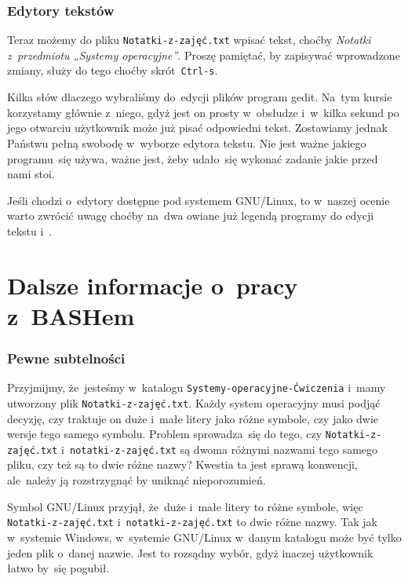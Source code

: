 \documentclass[10pt,t]{beamer}
\begin{document}
\begin{frame}
  \frametitle{Edytory tekstów}


  Teraz możemy do pliku \texttt{Notatki-z-zajęć.txt} wpisać tekst, choćby
  \textit{Notatki z~przedmiotu „Systemy operacyjne”}. Proszę pamiętać, by
  zapisywać wprowadzone zmiany, służy do tego choćby skrót~\texttt{Ctrl-s}.

  Kilka słów dlaczego wybraliśmy do~edycji plików program gedit. Na~tym
  kursie korzystamy głównie z~niego, gdyż jest on prosty w~obsłudze
  i~w~kilka sekund po jego otwarciu użytkownik może już pisać odpowiedni
  tekst. Zostawiamy jednak Państwu pełną swobodę w~wyborze edytora tekstu.
  Nie jest ważne jakiego programu~się używa, ważne jest, żeby udało~się
  wykonać zadanie jakie przed nami stoi.

  Jeśli chodzi o~edytory dostępne pod systemem GNU/Linux, to w~naszej
  ocenie warto zwrócić uwagę choćby na~dwa owiane już legendą programy
  do edycji tekstu 
  i~.

\end{frame}










\section{Dalsze informacje o~pracy z~BASHem}


\begin{frame}
  \frametitle{Pewne subtelności}


  Przyjmijmy, że~jesteśmy w~katalogu \texttt{Systemy-operacyjne-Ćwiczenia}
  i~mamy utworzony plik \texttt{Notatki-z-zajęć.txt}. Każdy system
  operacyjny musi podjąć decyzję, czy traktuje on duże i~małe litery
  jako różne symbole, czy jako dwie wersje tego samego symbolu. Problem
  sprowadza~się do tego, czy \texttt{Notatki-z-zajęć.txt}
  i~\texttt{notatki-z-zajęć.txt} są dwoma różnymi nazwami tego samego pliku,
  czy też są to dwie różne nazwy? Kwestia ta jest sprawą konwencji,
  ale~należy ją rozstrzygnąć by uniknąć nieporozumień.

  Symbol GNU/Linux przyjął, że~duże i~małe litery to \alert{różne} symbole,
  więc \texttt{Notatki-z-zajęć.txt} i~\texttt{notatki-z-zajęć.txt} to dwie
  różne nazwy. Tak jak w~systemie Windows, w~systemie GNU/Linux w~danym
  katalogu może być tylko jeden plik o~danej nazwie. Jest to rozsądny wybór,
  gdyż inaczej użytkownik łatwo by~się pogubił.

\end{frame}
\end{document}
